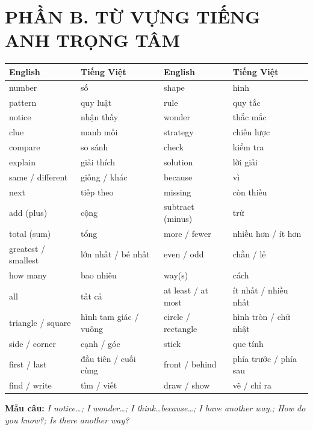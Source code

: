 \documentclass[11pt,a4paper]{article}
\begin{document}
\begin{center}
\end{center}

\section*{PHẦN B. TỪ VỰNG TIẾNG ANH TRỌNG TÂM}
\begin{tabularx}{\linewidth}{|l|X|l|X|}\hline
\textbf{English} & \textbf{Tiếng Việt} & \textbf{English} & \textbf{Tiếng Việt}\\\hline
number & số & shape & hình\\\hline
pattern & quy luật & rule & quy tắc\\\hline
notice & nhận thấy & wonder & thắc mắc\\\hline
clue & manh mối & strategy & chiến lược\\\hline
compare & so sánh & check & kiểm tra\\\hline
explain & giải thích & solution & lời giải\\\hline
same / different & giống / khác & because & vì\\\hline
next & tiếp theo & missing & còn thiếu\\\hline
add (plus) & cộng & subtract (minus) & trừ\\\hline
total (sum) & tổng & more / fewer & nhiều hơn / ít hơn\\\hline
greatest / smallest & lớn nhất / bé nhất & even / odd & chẵn / lẻ\\\hline
how many & bao nhiêu & way(s) & cách\\\hline
all & tất cả & at least / at most & ít nhất / nhiều nhất\\\hline
triangle / square & hình tam giác / vuông & circle / rectangle & hình tròn / chữ nhật\\\hline
side / corner & cạnh / góc & stick & que tính\\\hline
first / last & đầu tiên / cuối cùng & front / behind & phía trước / phía sau\\\hline
find / write & tìm / viết & draw / show & vẽ / chỉ ra\\\hline
\end{tabularx}
\textbf{Mẫu câu:} \textit{I notice\ldots; I wonder\ldots; I think\ldots because\ldots; I have another way.; How do you know?; Is there another way?}
\end{document}
